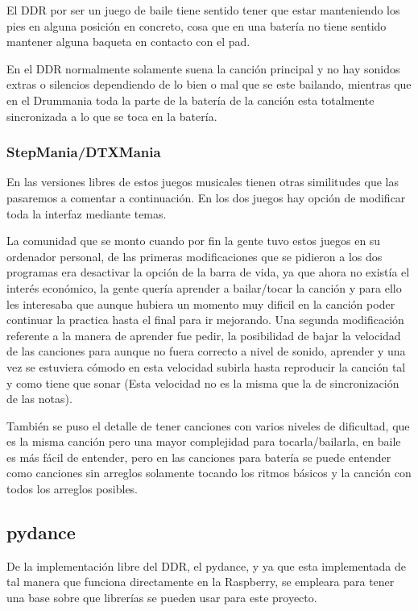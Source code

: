\documentclass[a4paper,11pt,oneside]{book}
\begin{document}
El DDR por ser un juego de baile tiene sentido tener que estar manteniendo los pies en alguna posición en concreto, cosa que en una batería no tiene sentido mantener alguna baqueta en contacto con el pad.

En el DDR normalmente solamente suena la canción principal y no hay sonidos extras o silencios dependiendo de lo bien o mal que se este bailando, mientras que en el Drummania toda la parte de la batería de la canción esta totalmente sincronizada a lo que se toca en la batería.

\subsubsection{StepMania/DTXMania}
En las versiones libres de estos juegos musicales tienen otras similitudes que las pasaremos a comentar a continuación.
En los dos juegos hay opción de modificar toda la interfaz mediante temas.

La comunidad que se monto cuando por fin la gente tuvo estos juegos en su ordenador personal, de las primeras modificaciones que se pidieron a los dos programas era desactivar la opción de la barra de vida, ya que ahora no existía el interés económico, la gente quería aprender a bailar/tocar la canción y para ello les interesaba que aunque hubiera un momento muy dificil en la canción poder continuar la practica hasta el final para ir mejorando.
Una segunda modificación referente a la manera de aprender fue pedir, la posibilidad de bajar la velocidad de las canciones para aunque no fuera correcto a nivel de sonido, aprender y una vez se estuviera cómodo en esta velocidad subirla hasta reproducir la canción tal y como tiene que sonar (Esta velocidad no es la misma que la de sincronización de las notas). 

También se puso el detalle de tener canciones con varios niveles de dificultad, que es la misma canción pero una mayor complejidad para tocarla/bailarla, en baile es más fácil de entender, pero en las canciones para batería se puede entender como canciones sin arreglos solamente tocando los ritmos básicos y la canción con todos los arreglos posibles.

\subsection{pydance}
De la implementación libre del DDR, el pydance, y ya que esta implementada de tal manera que funciona directamente en la Raspberry, se empleara para tener una base sobre que librerías se pueden usar para este proyecto.
\end{document}
